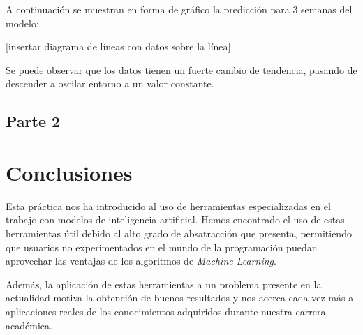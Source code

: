 \documentclass[12pt]{report} %
\begin{document}
A continuación se muestran en forma de gráfico la predicción para 3 semanas del modelo:

[insertar diagrama de líneas con datos sobre la línea]

Se puede observar que los datos tienen un fuerte cambio de tendencia, pasando de descender a oscilar entorno a un valor constante.

\section{Parte 2}

\chapter{Conclusiones}
\label{chap:conclusion}

Esta práctica nos ha introducido al uso de herramientas especializadas en el trabajo con modelos de inteligencia artificial. Hemos encontrado el uso de estas herramientas útil debido al alto grado de absatracción que presenta, permitiendo que usuarios no experimentados en el mundo de la programación puedan aprovechar las ventajas de los algoritmos de \textit{Machine Learning}.

Además, la aplicación de estas herramientas a un problema presente en la actualidad motiva la obtención de buenos resultados y nos acerca cada vez más a aplicaciones reales de los conocimientos adquiridos durante nuestra carrera académica.



\clearpage

{}
\label{chap:bibliography}
\printbibliography




\end{document}
